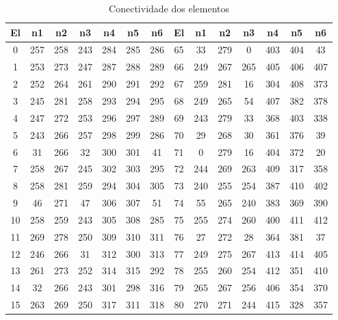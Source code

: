 \begin{apendicesenv}
\begin{table}[H]
	\ABNTEXfontereduzida
	\caption{Conectividade dos elementos}
	\centering
	\scriptsize
	\begin{tabular}{@{}ccccccc@{\hspace{1.0cm}}ccccccc@{}}
		\toprule
		 \centering El & n1 & n2 & n3 & n4 & n5 & n6 & El & n1 & n2 & n3 & n4 & n5 & n6 \\
		\midrule
		 0 &  257 &  258 &  243 &  284 &  285 &  286 &  65 &   33 &  279 &    0 &  403 &  404 &   43 \\
		1 &  253 &  273 &  247 &  287 &  288 &  289 &  66 &  249 &  267 &  265 &  405 &  406 &  407 \\
		2 &  252 &  264 &  261 &  290 &  291 &  292 &  67 &  259 &  281 &   16 &  304 &  408 &  373 \\
		3 &  245 &  281 &  258 &  293 &  294 &  295 &  68 &  249 &  265 &   54 &  407 &  382 &  378 \\
		4 &  247 &  272 &  253 &  296 &  297 &  289 &  69 &  243 &  279 &   33 &  368 &  403 &  338 \\
		5 &  243 &  266 &  257 &  298 &  299 &  286 &  70 &   29 &  268 &   30 &  361 &  376 &   39 \\
		6 &   31 &  266 &   32 &  300 &  301 &   41 &  71 &    0 &  279 &   16 &  404 &  372 &   20 \\
		7 &  258 &  267 &  245 &  302 &  303 &  295 &  72 &  244 &  269 &  263 &  409 &  317 &  358 \\
		8 &  258 &  281 &  259 &  294 &  304 &  305 &  73 &  240 &  255 &  254 &  387 &  410 &  402 \\
		9 &   46 &  271 &   47 &  306 &  307 &   51 &  74 &   55 &  265 &  240 &  383 &  369 &  390 \\
		10 &  258 &  259 &  243 &  305 &  308 &  285 &  75 &  255 &  274 &  260 &  400 &  411 &  412 \\
		11 &  269 &  278 &  250 &  309 &  310 &  311 &  76 &   27 &  272 &   28 &  364 &  381 &   37 \\
		12 &  246 &  266 &   31 &  312 &  300 &  313 &  77 &  249 &  275 &  267 &  413 &  414 &  405 \\
		13 &  261 &  273 &  252 &  314 &  315 &  292 &  78 &  255 &  260 &  254 &  412 &  351 &  410 \\
		14 &   32 &  266 &  243 &  301 &  298 &  316 &  79 &  265 &  267 &  256 &  406 &  354 &  370 \\
		15 &  263 &  269 &  250 &  317 &  311 &  318 &  80 &  270 &  271 &  244 &  415 &  328 &  357 \\

\end{tabular}
\end{table}
\end{apendicesenv}
